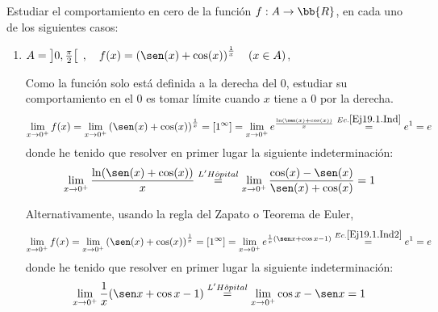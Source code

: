 \begin{ejercicio}
    Estudiar el comportamiento en cero de la función $f:A\to \bb{R}$, en cada uno de los siguientes casos:
    \begin{enumerate}        
        \item $A = \left] 0, \frac{\pi}{2}\right[\;,\quad f(x)=\left(\sen(x)+\cos(x)\right)^{\frac{1}{x}}\quad (x\in A)$,

        Como la función solo está definida a la derecha del 0, estudiar su comportamiento en el 0 es tomar límite cuando $x$ tiene a 0 por la derecha.
        \begin{equation*}
            \lim_{x\to 0^+}f(x)
            = \lim_{x\to 0^+} \left(\sen(x)+\cos(x)\right)^{\frac{1}{x}}
            = \left[1^\infty \right]
            = \lim_{x\to 0^+} e^{\frac{\ln(\sen(x) + \cos(x))}{x}}
            \stackrel{Ec. \ref{Ej19.1.Ind}}{=} e^1 = e
        \end{equation*}
        donde he tenido que resolver en primer lugar la siguiente indeterminación:
        \begin{equation}\label{Ej19.1.Ind}
            \lim_{x\to 0^+}{\frac{\ln(\sen(x) + \cos(x))}{x}}
            \stackrel{L'H\hat{o}pital}{=}
            \lim_{x\to 0^+} \frac{\cos(x)-\sen(x)}{\sen(x)+\cos(x)} = 1
        \end{equation}

        Alternativamente, usando la regla del Zapato o Teorema de Euler,
        \begin{equation*}
            \lim_{x\to 0^+}f(x)
            = \lim_{x\to 0^+} \left(\sen(x)+\cos(x)\right)^{\frac{1}{x}}
            = \left[1^\infty \right]
            = \lim_{x\to 0^+} e^{\frac{1}{x}(\sen x + \cos x -1)}
            \stackrel{Ec. \ref{Ej19.1.Ind2}}{=} e^1 = e
        \end{equation*}
        donde he tenido que resolver en primer lugar la siguiente indeterminación:
        \begin{equation}\label{Ej19.1.Ind2}
            \lim_{x\to 0^+} \frac{1}{x}(\sen x + \cos x -1)
            \stackrel{L'H\hat{o}pital}{=}
            \lim_{x\to 0^+} \cos x -\sen x = 1
        \end{equation}
        

\end{enumerate}
\end{ejercicio}
